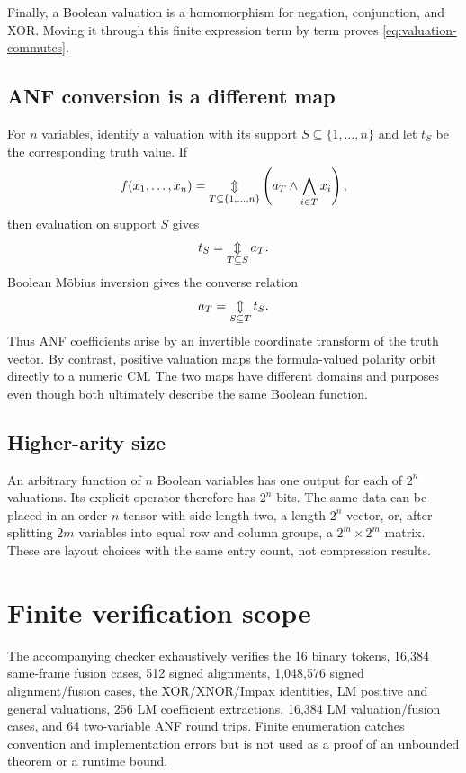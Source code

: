 Finally, a Boolean valuation is a homomorphism for negation, conjunction, and
XOR. Moving it through this finite expression term by term proves
\eqref{eq:valuation-commutes}.

\subsection{ANF conversion is a different map}

For $n$ variables, identify a valuation with its support
$S\subseteq\{1,\ldots,n\}$ and let $t_S$ be the corresponding truth value.
If
\begin{equation}
  f(x_1,\ldots,x_n)
  =\mathop{\mathbin{\Updownarrow}}_{T\subseteq\{1,\ldots,n\}}
    \left(a_T\wedge\bigwedge_{i\in T}x_i\right),
\end{equation}
then evaluation on support $S$ gives
\begin{equation}
  t_S=\mathop{\mathbin{\Updownarrow}}_{T\subseteq S}a_T.
\end{equation}
Boolean M\"obius inversion gives the converse relation
\begin{equation}
  a_T=\mathop{\mathbin{\Updownarrow}}_{S\subseteq T}t_S.
\end{equation}
Thus ANF coefficients arise by an invertible coordinate transform of the truth
vector. By contrast, positive valuation maps the formula-valued polarity orbit
directly to a numeric CM. The two maps have different domains and purposes
even though both ultimately describe the same Boolean function.

\subsection{Higher-arity size}

An arbitrary function of $n$ Boolean variables has one output for each of
$2^n$ valuations. Its explicit operator therefore has $2^n$ bits. The same
data can be placed in an order-$n$ tensor with side length two, a
length-$2^n$ vector, or, after splitting $2m$ variables into equal row and
column groups, a $2^m\times2^m$ matrix. These are layout choices with the same
entry count, not compression results.

\section{Finite verification scope}
\label{app:finite-checks}

The accompanying checker exhaustively verifies the 16 binary tokens, 16,384
same-frame fusion cases, 512 signed alignments, 1,048,576 signed
alignment/fusion cases, the XOR/XNOR/Impax identities, LM positive and general
valuations, 256 LM coefficient extractions, 16,384 LM valuation/fusion cases,
and 64 two-variable ANF round trips. Finite enumeration catches convention and
implementation errors but is not used as a proof of an unbounded theorem or a
runtime bound.
